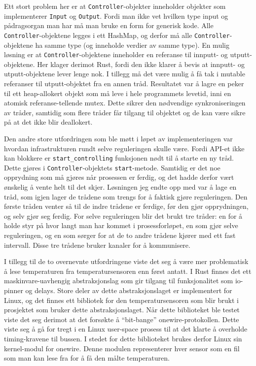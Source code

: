 Ett stort problem her er at \texttt{Controller}-objekter inneholder objekter som implementerer \texttt{Input} og \texttt{Output}. Fordi man ikke vet hvilken type input og pådragsorgan man har må man bruke en form for generisk kode. Alle \texttt{Controller}-objektene legges i ett HashMap, og derfor må alle \texttt{Controller}-objektene ha samme type (og inneholde verdier av samme type). En mulig løsning er at \texttt{Controller}-objektene inneholder en referanse til innputt- og utputt-objektene. Her klager derimot Rust, fordi den ikke klarer å bevis at innputt- og utputt-objektene lever lenge nok. I tillegg må det være mulig å få tak i mutable referanser til utputt-objektet fra en annen tråd. Resultatet var å lagre en peker til ett heap-allokert objekt som må leve i hele programmets levetid, inni en atomisk referanse-tellende mutex. Dette sikrer den nødvendige synkroniseringen av tråder, samtidig som flere tråder får tilgang til objektet og de kan være sikre på at det ikke blir deallokert.

Den andre store utfordringen som ble møtt i løpet av implementeringen var hvordan infrastrukturen rundt selve reguleringen skulle være. Fordi API-et ikke kan blokkere er \texttt{start\_controlling} funksjonen nødt til å starte en ny tråd. Dette gjøres i \texttt{Controller}-objektets \texttt{start}-metode. Samtidig er det noe opprydning som må gjøres når prosessen er ferdig, og det hadde derfor vært ønskelig å vente helt til det skjer. Løsningen jeg endte opp med var å lage en tråd, som igjen lager de trådene som trengs for å faktisk gjøre reguleringen. Den første tråden venter så til de indre trådene er ferdige, før den gjør opprydningen, og selv gjør seg ferdig. For selve reguleringen blir det brukt tre tråder: en for å holde styr på hvor langt man har kommet i prosessforløpet, en som gjør selve reguleringen, og en som sørger for at de to andre trådene kjører med ett fast intervall. Disse tre trådene bruker kanaler for å kommunisere.

I tillegg til de to overnevnte utfordringene viste det seg å være mer problematisk å lese temperaturen fra temperatursensoren enn først antatt. I Rust finnes det ett maskinvare-uavhengig abstraksjonslag som gir tilgang til funksjonalitet som io-pinner og delays. Store deler av dette abstraksjonslaget er implementert for Linux, og det finnes ett bibliotek for den temperatursensoren som blir brukt i prosjektet som bruker dette abstraksjonslaget. Når dette biblioteket ble testet viste det seg derimot at det forsøkte å ``bit-bange'' onewire-protokollen. Dette viste seg å gå for tregt i en Linux user-space prosess til at det klarte å overholde timing-kravene til bussen. I stedet for dette biblioteket brukes derfor Linux sin kernel-modul for onewire. Denne modulen representerer hver sensor som en fil som man kan lese fra for å få den målte temperaturen.